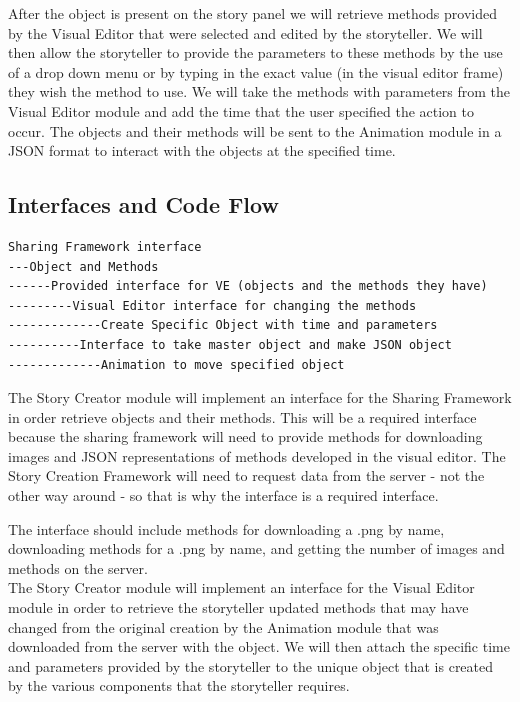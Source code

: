 \documentclass[12pt]{article}
\begin{document}
After the object is present on the story panel we will retrieve methods provided by the Visual Editor that were selected and edited by the storyteller.  We will then allow the storyteller to provide the parameters to these methods by the use of a drop down menu or by typing in the exact value (in the visual editor frame) they wish the method to use.  We will take the methods with parameters from the Visual Editor module and add the time that the user specified the action to occur.  The objects and their methods will be sent to the Animation module in a JSON format to interact with the objects at the specified time.  \\

\subsection{Interfaces and Code Flow}

\begin{verbatim}
Sharing Framework interface
---Object and Methods 
------Provided interface for VE (objects and the methods they have)
---------Visual Editor interface for changing the methods 
-------------Create Specific Object with time and parameters 
----------Interface to take master object and make JSON object 
-------------Animation to move specified object 
\end{verbatim}


The Story Creator module will implement an interface for the Sharing Framework in order retrieve objects and their methods.  This will be a required interface because the sharing framework will need to provide methods for downloading images and JSON representations of methods developed in the visual editor. The Story Creation Framework will need to request data from the server - not the other way around - so that is why the interface is a required interface.

The interface should include methods for downloading a .png by name, downloading methods for a .png by name, and getting the number of images and methods on the server.  \\

The Story Creator module will implement an interface for the Visual Editor module in order to retrieve the storyteller updated methods that may have changed from the original creation by the Animation module that was downloaded from the server with the object.  We will then attach the specific time and parameters provided by the storyteller to the unique object that is created by   the various components that the storyteller requires. \\ 
\end{document}
